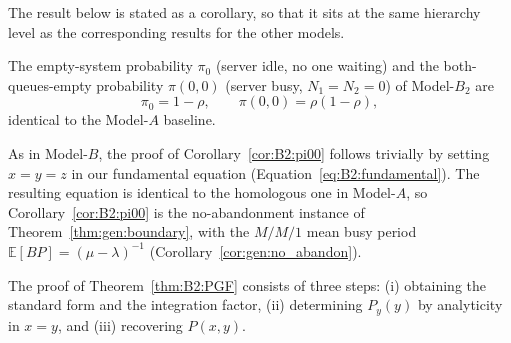 The result below is stated as a corollary, so that it sits at the same hierarchy level as the corresponding results for the other models.
\begin{corollary}\label{cor:B2:pi00}
    The empty-system probability $\pi_0$ (server idle, no one waiting) and the
    both-queues-empty probability $\pi(0,0)$ (server busy, $N_1=N_2=0$) of Model-$B_2$ are
    \begin{equation*}
        \pi_0 = 1-\rho, \qquad \pi(0,0) = \rho(1-\rho),
    \end{equation*}
    identical to the Model-$A$ baseline.
\end{corollary}
As in Model-$B$, the proof of Corollary~\ref{cor:B2:pi00} follows trivially by setting $x=y=z$ in our fundamental equation (Equation~\eqref{eq:B2:fundamental}). The resulting equation is identical to the homologous one in Model-$A$, so Corollary~\ref{cor:B2:pi00} is the no-abandonment instance of Theorem~\ref{thm:gen:boundary}, with the $M/M/1$ mean busy period $\mathbb{E}[BP]=(\mu-\lambda)^{-1}$ (Corollary~\ref{cor:gen:no_abandon}).

The proof of Theorem~\ref{thm:B2:PGF} consists of three steps: (i) obtaining the standard form and the integration factor, (ii) determining $P_y(y)$ by analyticity in $x=y$, and (iii) recovering $P(x,y)$.

